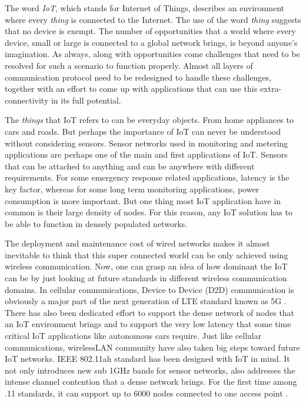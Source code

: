 \label{chapter:introduction}

The word \textit{IoT}, which stands for Internet of Things, describes an environment where every \textit{thing} is connected to the Internet. The use of the word \textit{thing} suggests that no device is exempt. The number of opportunities that a world where every device, small or large is connected to a global network brings, is beyond anyone's imagination. As always, along with opportunities come challenges that need to be resolved for such a scenario to function properly. Almost all layers of communication protocol need to be redesigned to handle these challenges, together with an effort to come up with applications that can use this extra-connectivity in its full potential.

The \textit{things} that IoT refers to can be everyday objects. From home appliances to cars and roads. But perhaps the importance of IoT can never be understood without considering sensors. Sensor networks used in monitoring and metering applications are perhaps one of the main and first applications of IoT. Sensors that can be attached to anything and can be anywhere with different requirements. For some emergency response related applications, latency is the key factor, whereas for some long term monitoring applications, power consumption is more important. But one thing most IoT application have in common is their large density of nodes. For this reason, any IoT solution has to be able to function in densely populated networks. 

The deployment and maintenance cost of wired networks makes it almost inevitable to think that this super connected world can be only achieved using wireless communication. Now, one can grasp an idea of how dominant the IoT can be by just looking at future standards in different wireless communication domains. In cellular communications, Device to Device (D2D) communication is obviously a major part of the next generation of LTE standard known as 5G \cite{doppler2009device}. There has also been dedicated effort to support the dense network of nodes that an IoT environment brings and to support the very low latency that some time critical IoT applications like autonomous cars require. Just like cellular communications, wirelessLAN community have also taken big steps toward future IoT networks. IEEE 802.11ah standard has been designed with IoT in mind. It not only introduces new sub 1GHz bands for sensor networks, also addresses the intense channel contention that a dense network brings. For the first time among .11 standards, it can support up to 6000 nodes connected to one access point \cite{khorov2015survey}. 

